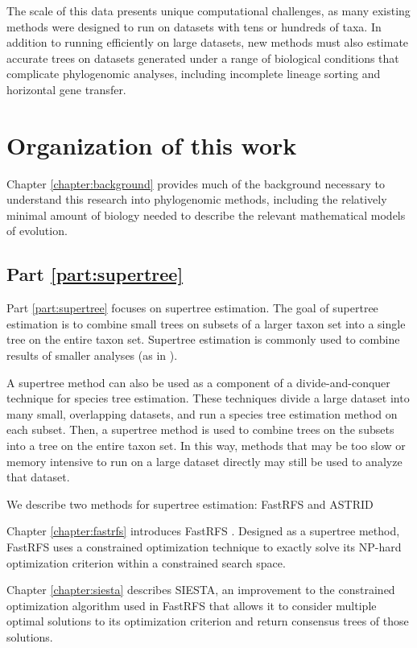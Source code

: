 \documentclass[edeposit,fullpage]{uiucthesis2014}
\theoremstyle{definition}
\begin{document}
The scale of this data presents unique computational challenges, as
many existing methods were designed to run on datasets with tens or
hundreds of taxa. In addition to running efficiently on large
datasets, new methods must also estimate accurate trees on datasets
generated under a range of biological conditions that complicate
phylogenomic analyses, including incomplete lineage sorting and
horizontal gene transfer.

\section{Organization of this work}

Chapter \ref{chapter:background} provides much of the background
necessary to understand this research into phylogenomic methods,
including the relatively minimal amount of biology needed to describe
the relevant mathematical models of evolution.

\subsection*{Part \ref{part:supertree}}

Part \ref{part:supertree} focuses on supertree estimation. The goal of
supertree estimation is to combine small trees on subsets of a larger
taxon set into a single tree on the entire taxon set. Supertree
estimation is commonly used to combine results of smaller analyses (as
in \cite{seabirds,cpl,thpl,marsupials,placental}).

A supertree method can also be used as a component of a
divide-and-conquer technique for species tree estimation. These
techniques \cite{} divide a large dataset into many small, overlapping
datasets, and run a species tree estimation method on each
subset. Then, a supertree method is used to combine trees on the
subsets into a tree on the entire taxon set. In this way, methods that
may be too slow or memory intensive to run on a large dataset directly
may still be used to analyze that dataset.

We describe two methods for supertree estimation: FastRFS and ASTRID

Chapter \ref{chapter:fastrfs} introduces FastRFS
\cite{fastrfs}. Designed as a supertree method, FastRFS uses a
constrained optimization technique to exactly solve its NP-hard
optimization criterion within a constrained search space.

Chapter \ref{chapter:siesta} describes SIESTA, an improvement to the
constrained optimization algorithm used in FastRFS that allows it to
consider multiple optimal solutions to its optimization criterion and
return consensus trees of those solutions.
\end{document}

